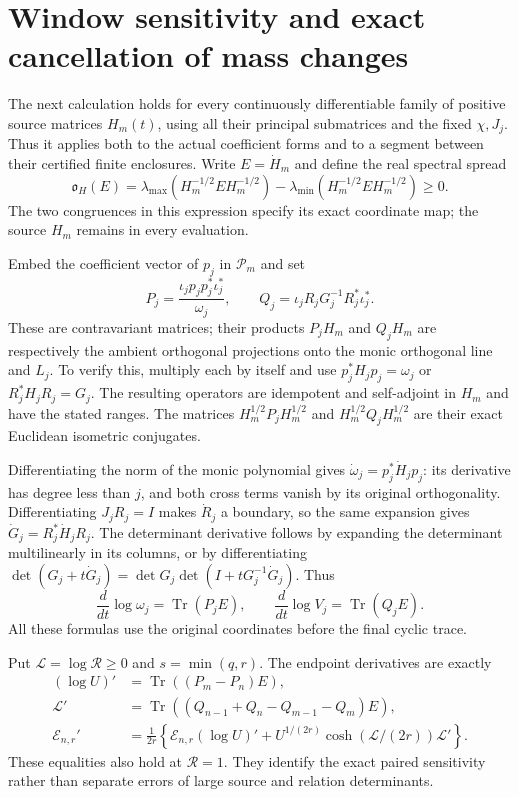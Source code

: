 \documentclass[11pt]{article}
\newcommand{\Tr}{\operatorname{Tr}}
\begin{document}
\section{Window sensitivity and exact cancellation of mass changes}

The next calculation holds for every continuously differentiable family of positive
source matrices $H_m(t)$, using all their principal submatrices and
the fixed $\chi,J_j$. Thus it applies both to the actual coefficient
forms and to a segment between their certified finite enclosures.
Write $E=\dot H_m$ and define the real spectral spread
\[
 \mathfrak o_H(E)=\lambda_{\max}(H_m^{-1/2}EH_m^{-1/2})
                -\lambda_{\min}(H_m^{-1/2}EH_m^{-1/2})\ge0.
                                                               \tag{EW.29}
\]
The two congruences in this expression specify its exact coordinate
map; the source $H_m$ remains in every evaluation.

Embed the coefficient vector of $p_j$ in $\mathcal P_m$ and set
\[
 P_j=\frac{\iota_jp_jp_j^*\iota_j^*}{\omega_j},\qquad
 Q_j=\iota_jR_jG_j^{-1}R_j^*\iota_j^*.
                                                               \tag{EW.30}
\]
These are contravariant matrices; their products $P_jH_m$ and
$Q_jH_m$ are respectively the ambient orthogonal projections onto
the monic orthogonal line and $L_j$. To verify this, multiply each
by itself and use $p_j^*H_jp_j=\omega_j$ or
$R_j^*H_jR_j=G_j$. The resulting operators are idempotent and
self-adjoint in $H_m$ and have the stated ranges. The matrices
$H_m^{1/2}P_jH_m^{1/2}$ and $H_m^{1/2}Q_jH_m^{1/2}$ are their
exact Euclidean isometric conjugates.

Differentiating the norm of the monic polynomial gives
$\dot\omega_j=p_j^*\dot H_jp_j$: its derivative has degree less
than $j$, and both cross terms vanish by its original orthogonality.
Differentiating $J_jR_j=I$ makes $\dot R_j$ a boundary, so the
same expansion gives $\dot G_j=R_j^*\dot H_jR_j$.
The determinant derivative follows by expanding the determinant
multilinearly in its columns, or by differentiating
$\det(G_j+t\dot G_j)=\det G_j\det(I+tG_j^{-1}\dot G_j)$.
Thus
\[
 \frac d{dt}\log\omega_j=\Tr(P_jE),\qquad
 \frac d{dt}\log V_j=\Tr(Q_jE).                             \tag{EW.31}
\]
All these formulas use the original coordinates before the final
cyclic trace.

Put $\mathscr L=\log\mathscr R\ge0$ and $s=\min(q,r)$.
The endpoint derivatives are exactly
\[
 \begin{split}
 (\log U)'&=\Tr((P_m-P_n)E),\\
 \mathscr L'&=\Tr((Q_{n-1}+Q_n-Q_{m-1}-Q_m)E),\\
 \mathcal E_{n,r}'&=\frac1{2r}\left\{
 \mathcal E_{n,r}(\log U)'
 +U^{1/(2r)}\cosh(\mathscr L/(2r))\mathscr L'\right\}.
 \end{split}                                                   \tag{EW.32}
\]
These equalities also hold at $\mathscr R=1$. They identify the
exact paired sensitivity rather than separate errors of large source
and relation determinants.
\end{document}
